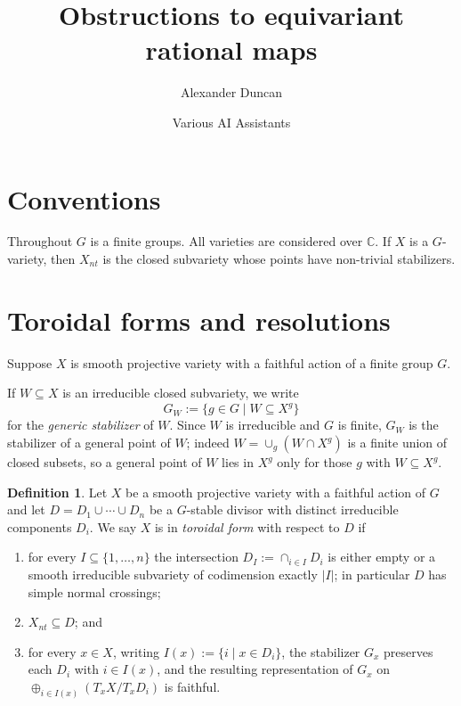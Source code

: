 \documentclass[11pt]{amsart}
\theoremstyle{plain}
\theoremstyle{definition}
\newtheorem{definition}[theorem]{Definition}
\theoremstyle{remark}
\numberwithin{equation}{section}
\begin{document}
\title{Obstructions to equivariant rational maps}

\author{Alexander Duncan}
\author{Various AI Assistants}

\maketitle

\section{Conventions}

Throughout $G$ is a finite groups.  All varieties are considered over
$\mathbb{C}$.  If $X$ is a $G$-variety, then $X_{nt}$ is the closed
subvariety whose points have non-trivial stabilizers.

\section{Toroidal forms and resolutions}

Suppose $X$ is smooth projective variety with a faithful action
of a finite group $G$. 

If $W \subseteq X$ is an irreducible closed subvariety, we write
\[
G_W := \{ g \in G \mid W \subseteq X^g \}
\]
for the \emph{generic stabilizer} of $W$.  Since $W$ is irreducible and
$G$ is finite, $G_W$ is the stabilizer of a general point of $W$; indeed
$W = \cup_{g} (W \cap X^g)$ is a finite union of closed subsets, so a
general point of $W$ lies in $X^g$ only for those $g$ with $W \subseteq X^g$.

\begin{definition} \label{def:toroidal}
Let $X$ be a smooth projective variety with a faithful action of $G$ and let
$D = D_1 \cup \cdots \cup D_n$ be a $G$-stable divisor with distinct
irreducible components $D_i$.  We say $X$ is in \emph{toroidal form} with
respect to $D$ if
\begin{enumerate}
\item for every $I \subseteq \{1,\ldots,n\}$ the intersection
$D_I := \cap_{i \in I} D_i$ is either empty or a smooth irreducible
subvariety of codimension exactly $|I|$; in particular $D$ has simple normal
crossings;
\item $X_{nt} \subseteq D$; and
\item for every $x \in X$, writing $I(x) := \{ i \mid x \in D_i \}$, the
stabilizer $G_x$ preserves each $D_i$ with $i \in I(x)$, and the resulting
representation of $G_x$ on $\oplus_{i \in I(x)} (T_xX/T_xD_i)$ is faithful.
\end{enumerate}
\end{definition}
\end{document}
